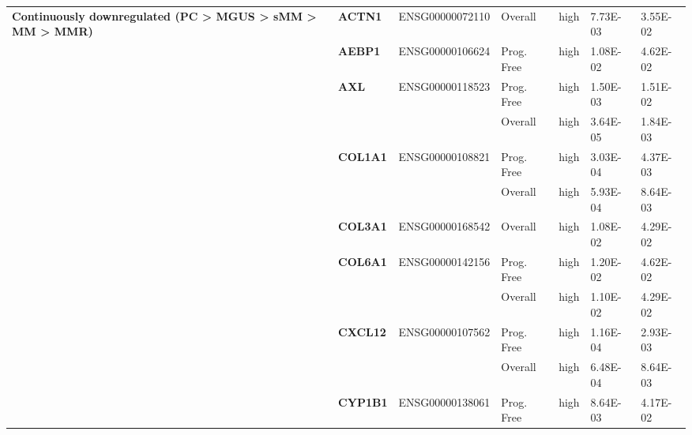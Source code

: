 {\begin{longtable}{|>{\bfseries}p{3cm}|>{\bfseries}p{1.9cm}|p{3cm}|p{2cm}|p{2cm}|p{1.5cm}|p{1.5cm}|}
        \hline

        Continuously downregulated (PC > MGUS > sMM > MM > MMR) & ACTN1    & ENSG00000072110 & Overall    & high & 7.73E-03 & 3.55E-02 \\
        \hhline{~------}
                                                                & AEBP1    & ENSG00000106624 & Prog. Free & high & 1.08E-02 & 4.62E-02 \\
        \hhline{~------}
                                                                & AXL      & ENSG00000118523 & Prog. Free & high & 1.50E-03 & 1.51E-02 \\
        \hhline{~~~----}
                                                                &          &                 & Overall    & high & 3.64E-05 & 1.84E-03 \\
        \hhline{~------}
                                                                & COL1A1   & ENSG00000108821 & Prog. Free & high & 3.03E-04 & 4.37E-03 \\
        \hhline{~~~----}
                                                                &          &                 & Overall    & high & 5.93E-04 & 8.64E-03 \\
        \hhline{~------}
                                                                & COL3A1   & ENSG00000168542 & Overall    & high & 1.08E-02 & 4.29E-02 \\
        \hhline{~------}
                                                                & COL6A1   & ENSG00000142156 & Prog. Free & high & 1.20E-02 & 4.62E-02 \\
        \hhline{~~~----}
                                                                &          &                 & Overall    & high & 1.10E-02 & 4.29E-02 \\
        \hhline{~------}
                                                                & CXCL12   & ENSG00000107562 & Prog. Free & high & 1.16E-04 & 2.93E-03 \\
        \hhline{~~~----}
                                                                &          &                 & Overall    & high & 6.48E-04 & 8.64E-03 \\
        \hhline{~------}
                                                                & CYP1B1   & ENSG00000138061 & Prog. Free & high & 8.64E-03 & 4.17E-02 \\

\end{longtable}}
